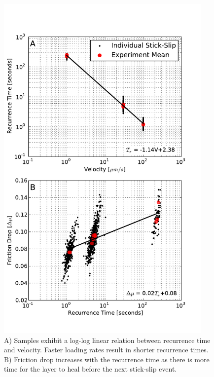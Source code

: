 \begin{figure}
\includegraphics[width=25pc]{chap_electrical/ss_props.pdf}
\caption{A) Samples exhibit a log-log linear relation between recurrence time and velocity.  Faster loading rates result in shorter recurrence times. B) Friction drop increases with the recurrence time as there is more time for the layer to heal before the next stick-slip event.}
\label{ss_props}
\end{figure}

